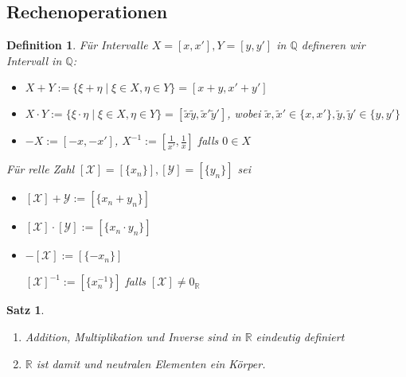 \documentclass[ngerman,a4paper]{report}
\theoremstyle{break}
\newtheorem{satz}[theorem]{Satz}
\newtheorem*{definition}{Definition}
\begin{document}
\subsection*{Rechenoperationen}
\begin{definition}
	Für Intervalle $X=[x,x'], Y=[y,y']$ in $\mathbb{Q}$ defineren wir Intervall in $\mathbb{Q}$:
	\begin{itemize}
		\item $X + Y := \{\xi + \eta \mid \xi \in X, \eta\in Y\} = [x + y, x' + y']$
		\item $X\cdot Y :=\{\xi \cdot \eta \mid \xi \in X, \eta\in Y\} = [\tilde{x}\tilde{y}, \tilde{x}'\tilde{y}']$, wobei $\tilde{x},\tilde{x}'\in\{x,x'\},\tilde{y},\tilde{y}'\in\{y,y'\}$
		\item $-X := [-x,-x']$, $X^{-1}:=[\frac{1}{x'}, \frac{1}{x}]$ falls $0\in X$
	\end{itemize}

	Für relle Zahl $[\mathcal{X}] = [\{x_n\}], [\mathcal{Y}]=[\{y_n\}]$ sei
	\begin{itemize}
		\item $[\mathcal{X}]+\mathcal{Y} :=[\{x_n + y_n\}]$
		\item $[\mathcal{X}]\cdot[\mathcal{Y}] :=[\{x_n\cdot y_n\}]$
		\item $-[\mathcal{X}]:=[\{-x_n\}]$
			
			$[\mathcal{X}]^{-1} := [\{x_n^{-1}\}]$ falls $[\mathcal{X}]\neq 0_\mathbb{R}$
	\end{itemize}
\end{definition}

\begin{satz}
	\begin{enumerate}[label={\arabic*)}]
		\item Addition, Multiplikation und Inverse sind in $\mathbb{R}$ eindeutig definiert
		\item $\mathbb{R}$ ist damit und neutralen Elementen ein Körper.
	\end{enumerate}
\end{satz}
\end{document}
